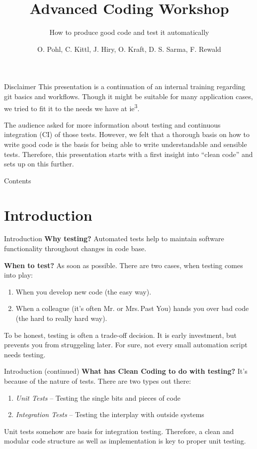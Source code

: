 \documentclass[aspectratio=1610, 9pt]{beamer}
\title{Advanced Coding Workshop}
\subtitle{How to produce good code and test it automatically}
\author[\iethree{}-Team]{O. Pohl, C. Kittl, J. Hiry, O. Kraft, D. S. Sarma, F. Rewald}
\institute[\iethree{}]{Institute of Energy Systems, Energy Efficiency and Energy Economics}
\newcommand{\iethree}{ie\textsuperscript{3}}
\begin{document}
\maketitle

\begin{frame}{Disclaimer}
    This presentation is a continuation of an internal training regarding git basics and workflows.
    Though it might be suitable for many application cases, we tried to fit it to the needs we have at \iethree{}.

    The audience asked for more information about testing and continuous integration (CI) of those tests.
    However, we felt that a thorough basis on how to write good code is the basis for being able to write understandable and sensible tests.
    Therefore, this presentation starts with a first insight into “clean code” and sets up on this further.
\end{frame}

\begin{frame}{Contents}
    \tableofcontents
\end{frame}

\section{Introduction}
\begin{frame}{Introduction}
    \textcolor{tugreen}{\textbf{Why testing?}} Automated tests help to maintain software functionality throughout changes in code base.

    \textcolor{tugreen}{\textbf{When to test?}} As soon as possible. There are two cases, when testing comes into play:
    \begin{enumerate}
        \item When you develop new code (the easy way).
        \item When a colleague (it's often Mr. or Mrs.\,{}Past You) hands you over bad code (the hard to really hard way).
    \end{enumerate}

    To be honest, testing is often a trade-off decision.
    It is early investment, but prevents you from struggeling later.
    For sure, not every small automation script needs testing.
\end{frame}

\begin{frame}{Introduction (continued)}
    \textcolor{tugreen}{\textbf{What has Clean Coding to do with testing?}} It's because of the nature of tests. There are two types out there:
    \begin{enumerate}
        \item \textit{Unit Tests} -- Testing the single bits and pieces of code
        \item \textit{Integration Tests} -- Testing the interplay with outside systems
    \end{enumerate}

    Unit tests somehow are basis for integration testing.
    Therefore, a clean and modular code structure as well as implementation is key to proper unit testing.
\end{frame}
\end{document}

